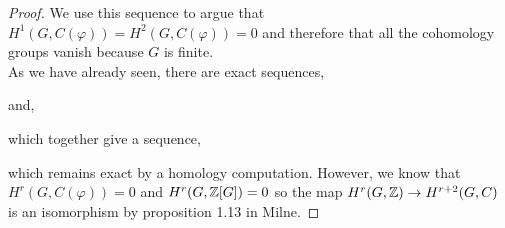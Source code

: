 \documentclass[12pt]{extarticle}
\begin{document}
\begin{enumerate}
\begin{proof}
We use this sequence to argue that $H^1(G, C(\varphi)) = H^2(G, C(\varphi)) = 0$ and therefore that all the cohomology groups vanish because $G$ is finite. 
\bigskip\\
As we have already seen, there are exact sequences,
\begin{center}
\end{center}
and, 
\begin{center}
\end{center}
which together give a sequence,
\begin{center}
\end{center}
which remains exact by a homology computation. However, we know that $H^r(G, C(\varphi)) = 0$ and $H^r(G, \mathbb{Z}[G]) = 0$ so the map $H^r(G, \mathbb{Z}) \to H^{r+2}(G, C)$ is an isomorphism by proposition 1.13 in Milne. 

\end{proof}
\end{enumerate}
\end{document}
